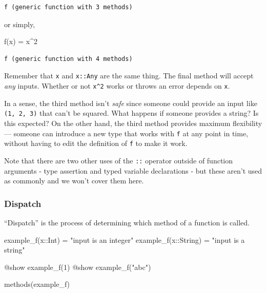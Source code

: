 \documentclass[
]{article}
\newenvironment{Shaded}{\begin{snugshade}}{\end{snugshade}}
\newcommand{\DataTypeTok}[1]{\textcolor[rgb]{0.68,0.00,0.00}{#1}}
\newcommand{\FloatTok}[1]{\textcolor[rgb]{0.68,0.00,0.00}{#1}}
\newcommand{\FunctionTok}[1]{\textcolor[rgb]{0.28,0.35,0.67}{#1}}
\newcommand{\NormalTok}[1]{\textcolor[rgb]{0.00,0.23,0.31}{#1}}
\newcommand{\OperatorTok}[1]{\textcolor[rgb]{0.37,0.37,0.37}{#1}}
\newcommand{\PreprocessorTok}[1]{\textcolor[rgb]{0.68,0.00,0.00}{#1}}
\newcommand{\StringTok}[1]{\textcolor[rgb]{0.13,0.47,0.30}{#1}}
\begin{document}
\begin{verbatim}
f (generic function with 3 methods)
\end{verbatim}

or simply,

\begin{Shaded}
\begin{Highlighting}[]
\FunctionTok{f}\NormalTok{(x) }\OperatorTok{=}\NormalTok{ x}\OperatorTok{\^{}}\FloatTok{2}
\end{Highlighting}
\end{Shaded}

\begin{verbatim}
f (generic function with 4 methods)
\end{verbatim}

Remember that \texttt{x} and \texttt{x::Any} are the same thing. The
final method will accept \emph{any} inputs. Whether or not
\texttt{x\^{}2} works or throws an error depends on \texttt{x}.

In a sense, the third method isn't \emph{safe} since someone could
provide an input like \texttt{(1,\ 2,\ 3)} that can't be squared. What
happens if someone provides a string? Is this expected? On the other
hand, the third method provides maximum flexibility --- someone can
introduce a new type that works with \texttt{f} at any point in time,
without having to edit the definition of \texttt{f} to make it work.

Note that there are two other uses of the \texttt{::} operator outside
of function arguments - type assertion and typed variable declarations -
but these aren't used as commonly and we won't cover them here.

\subsubsection{Dispatch}\label{dispatch}

``Dispatch'' is the process of determining which method of a function is
called.

\begin{Shaded}
\begin{Highlighting}[]
\FunctionTok{example\_f}\NormalTok{(x}\OperatorTok{::}\DataTypeTok{Int}\NormalTok{) }\OperatorTok{=} \StringTok{"input is an integer"}
\FunctionTok{example\_f}\NormalTok{(x}\OperatorTok{::}\DataTypeTok{String}\NormalTok{) }\OperatorTok{=} \StringTok{"input is a string"}

\PreprocessorTok{@show} \FunctionTok{example\_f}\NormalTok{(}\FloatTok{1}\NormalTok{)}
\PreprocessorTok{@show} \FunctionTok{example\_f}\NormalTok{(}\StringTok{"abc"}\NormalTok{)}

\FunctionTok{methods}\NormalTok{(example\_f)}
\end{Highlighting}
\end{Shaded}
\end{document}
